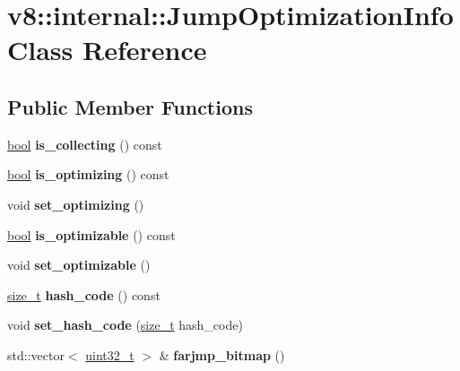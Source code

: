 \hypertarget{classv8_1_1internal_1_1JumpOptimizationInfo}{}\section{v8\+:\+:internal\+:\+:Jump\+Optimization\+Info Class Reference}
\label{classv8_1_1internal_1_1JumpOptimizationInfo}
\subsection*{Public Member Functions}
\begin{DoxyCompactItemize}
\item 
\mbox{\label{classv8_1_1internal_1_1JumpOptimizationInfo_ae0820dee6fb60dc2a432f3d5b47c6b3e}} 
\mbox{\hyperlink{classbool}{bool}} {\bfseries is\+\_\+collecting} () const
\item 
\mbox{\label{classv8_1_1internal_1_1JumpOptimizationInfo_ade9838e933ee373c91680fe508fae8a5}} 
\mbox{\hyperlink{classbool}{bool}} {\bfseries is\+\_\+optimizing} () const
\item 
\mbox{\label{classv8_1_1internal_1_1JumpOptimizationInfo_ab3ac000b780c1c1e1d01c737127fd5fd}} 
void {\bfseries set\+\_\+optimizing} ()
\item 
\mbox{\label{classv8_1_1internal_1_1JumpOptimizationInfo_a828caf512010bf03a3d915ca6918dbb7}} 
\mbox{\hyperlink{classbool}{bool}} {\bfseries is\+\_\+optimizable} () const
\item 
\mbox{\label{classv8_1_1internal_1_1JumpOptimizationInfo_a275ace8e69caf7e79e9f421a3e0de091}} 
void {\bfseries set\+\_\+optimizable} ()
\item 
\mbox{\label{classv8_1_1internal_1_1JumpOptimizationInfo_a3ece98bc718610dcb91dc68b972662e9}} 
\mbox{\hyperlink{classsize__t}{size\+\_\+t}} {\bfseries hash\+\_\+code} () const
\item 
\mbox{\label{classv8_1_1internal_1_1JumpOptimizationInfo_a6db5497c6bb5c8ef7e436aed7f9cc847}} 
void {\bfseries set\+\_\+hash\+\_\+code} (\mbox{\hyperlink{classsize__t}{size\+\_\+t}} hash\+\_\+code)
\item 
\mbox{\label{classv8_1_1internal_1_1JumpOptimizationInfo_a938f42f34ef915246c9e72a0786c6a73}} 
std\+::vector$<$ \mbox{\hyperlink{classuint32__t}{uint32\+\_\+t}} $>$ \& {\bfseries farjmp\+\_\+bitmap} ()
\end{DoxyCompactItemize}


